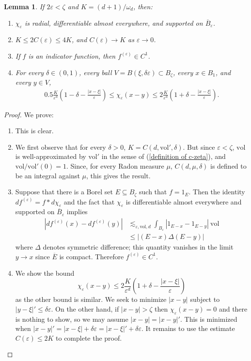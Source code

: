 \documentclass[reqno,12pt,letterpaper]{amsart}
\newcommand{\vol}{\mathrm{vol}}
\newtheorem{lemma}[theorem]{Lemma}
\theoremstyle{definition}
\numberwithin{equation}{section}
\begin{document}
\begin{lemma}\label{convolution fax}
If $2\varepsilon < \zeta$ and $K = (d+1)/\omega_d$, then:
\begin{enumerate}
\item $\chi_\varepsilon$ is radial, differentiable almost everywhere, and supported on $\overline B_\varepsilon$.
\item $K \leq 2C(\varepsilon) \leq 4K$, and $C(\varepsilon) \to K$ as $\varepsilon \to 0$.
\item If $f$ is an indicator function, then $f^{(\varepsilon)} \in C^1$.
\item For every $\delta \in (0, 1)$, every ball $V = B(\xi, \delta\varepsilon) \subset B_\zeta$, every $x \in B_1$, and every $y \in V$,
\begin{align*}
0.5\frac{K}{\varepsilon^d}\left(1 - \delta - \frac{|x - \xi|}{\varepsilon}\right) \leq \chi_\varepsilon(x - y) \leq 2\frac{K}{\varepsilon^d}\left(1 + \delta - \frac{|x - \xi|}{\varepsilon}\right).
\end{align*}
\end{enumerate}
\end{lemma}
\begin{proof}
We prove:
\begin{enumerate}
\item This is clear.
\item We first observe that for every $\delta > 0$, $K = C(d, \vol', \delta)$.
But since $\varepsilon < \zeta$, $\vol$ is well-approximated by $\vol'$ in the sense of (\ref{definition of c-zeta}), and $\vol/\vol'(0) = 1$.
Since, for every Radon measure $\mu$, $C(d, \mu, \delta)$ is defined to be an integral against $\mu$, this gives the result.
\item Suppose that there is a Borel set $E \subseteq B_\zeta$ such that $f = 1_E$. Then the identity $df^{(\varepsilon)} = f * d\chi_\varepsilon$ and the fact that $\chi_\varepsilon$ is differentiable almost everywhere and supported on $\overline B_\varepsilon$ implies
\begin{align*}
|df^{(\varepsilon)}(x) - df^{(\varepsilon)}(y)| &\lesssim_{\varepsilon,\vol,d} \int_{B_\varepsilon} |1_{E - x} - 1_{E - y}| ~\vol \\
&\leq |(E - x) \Delta (E - y)|
\end{align*}
where $\Delta$ denotes symmetric difference; this quantity vanishes in the limit $y \to x$ since $\overline E$ is compact. Therefore $f^{(\varepsilon)} \in C^1$.
\item We show the bound
$$\chi_\varepsilon(x - y) \leq 2\frac{K}{\varepsilon^d}\left(1 + \delta - \frac{|x - \xi|}{\varepsilon}\right)$$
as the other bound is similar.
We seek to minimize $|x - y|$ subject to $|y - \xi|' \leq \delta\varepsilon$.
On the other hand, if $|x - y| > \zeta$ then $\chi_\varepsilon(x - y) = 0$ and there is nothing to show, so we may assume $|x - y| = |x - y|'$.
This is minimized when $|x - y|' = |x - \xi| + \delta\varepsilon = |x - \xi|' + \delta\varepsilon$.
It remains to use the estimate $C(\varepsilon) \leq 2K$ to complete the proof.
 \qedhere
\end{enumerate}
\end{proof}
\end{document}
